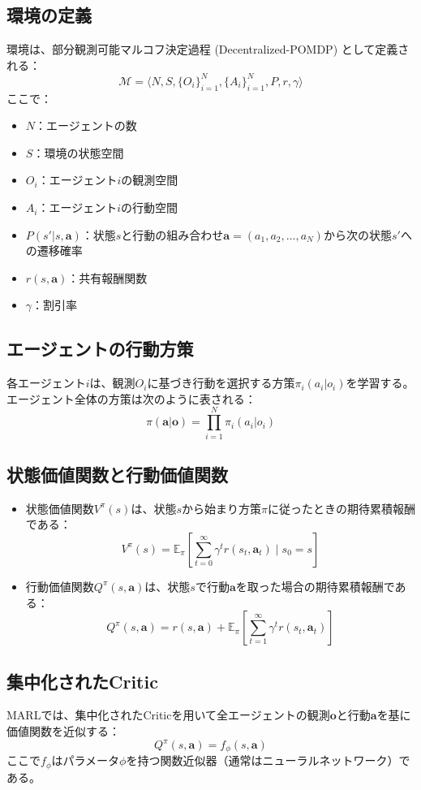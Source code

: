 \subsection*{環境の定義}
環境は、部分観測可能マルコフ決定過程 (Decentralized-POMDP) として定義される：
\[
\mathcal{M} = \langle N, S, \{O_i\}_{i=1}^N, \{A_i\}_{i=1}^N, P, r, \gamma \rangle
\]
ここで：
\begin{itemize}
    \item $N$：エージェントの数
    \item $S$：環境の状態空間
    \item $O_i$：エージェント$i$の観測空間
    \item $A_i$：エージェント$i$の行動空間
    \item $P(s' | s, \boldsymbol{a})$：状態$s$と行動の組み合わせ$\boldsymbol{a} = (a_1, a_2, \dots, a_N)$から次の状態$s'$への遷移確率
    \item $r(s, \boldsymbol{a})$：共有報酬関数
    \item $\gamma$：割引率
\end{itemize}

\subsection*{エージェントの行動方策}
各エージェント$i$は、観測$O_i$に基づき行動を選択する方策$\pi_i(a_i | o_i)$を学習する。エージェント全体の方策は次のように表される：
\[
\pi(\boldsymbol{a} | \boldsymbol{o}) = \prod_{i=1}^N \pi_i(a_i | o_i)
\]

\subsection*{状態価値関数と行動価値関数}
\begin{itemize}
    \item 状態価値関数$V^\pi(s)$は、状態$s$から始まり方策$\pi$に従ったときの期待累積報酬である：
    \[
    V^\pi(s) = \mathbb{E}_\pi \left[ \sum_{t=0}^\infty \gamma^t r(s_t, \boldsymbol{a}_t) \mid s_0 = s \right]
    \]
    \item 行動価値関数$Q^\pi(s, \boldsymbol{a})$は、状態$s$で行動$\boldsymbol{a}$を取った場合の期待累積報酬である：
    \[
    Q^\pi(s, \boldsymbol{a}) = r(s, \boldsymbol{a}) + \mathbb{E}_\pi \left[ \sum_{t=1}^\infty \gamma^t r(s_t, \boldsymbol{a}_t) \right]
    \]
\end{itemize}

\subsection*{集中化されたCritic}
MARLでは、集中化されたCriticを用いて全エージェントの観測$\boldsymbol{o}$と行動$\boldsymbol{a}$を基に価値関数を近似する：
\[
Q^\pi(s, \boldsymbol{a}) = f_\phi(s, \boldsymbol{a})
\]
ここで$f_\phi$はパラメータ$\phi$を持つ関数近似器（通常はニューラルネットワーク）である。

